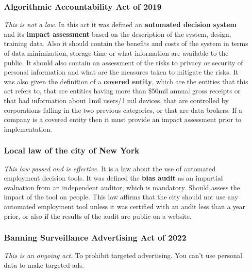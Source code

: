 \subsubsection{Algorithmic Accountability Act of 2019}
\textit{This is not a law}. In this act it was defined an \textbf{automated decision system} and its \textbf{impact assessment} based on the description of the system, design, training data. Also it should contain the benefits and costs of the system in terms of data minimization, storage time or what information are available to the public. It should also contain an assessment of the risks to privacy or security of personal information and what are the measures taken to mitigate the risks. It was also given the definition of a \textbf{covered entity}, which are the entities that this act refers to, that are entities having more than \$50mil annual gross receipts or that had information about 1mil users/1 mil devices, that are controlled by corporations falling in the two previous categories, or that are data brokers. If a company is a covered entity then it must provide an impact assessment prior to implementation.
\subsubsection{Local law of the city of New York}
\textit{This law passed and is effective}. It is a law about the use of automated employment decision tools. It was defined the \textbf{bias audit} as an impartial evaluation from an independent auditor, which is mandatory. Should assess the impact of the tool on people. This law affirms that the city should not use any automated employment tool unless it was certified with an audit less than a year prior, or also if the results of the audit are public on a website.
\subsubsection{Banning Surveillance Advertising Act of 2022}
\textit{This is an ongoing act.} To prohibit targeted advertising. You can't use personal data to make targeted ads.
